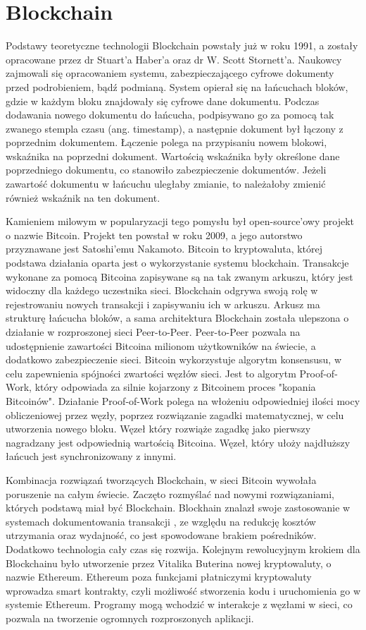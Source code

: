 \documentclass[a4paper,12pt]{book}
\begin{document}
\chapter{Blockchain}
Podstawy teoretyczne technologii Blockchain powstały już w roku 1991, a zostały opracowane przez dr Stuart'a Haber'a oraz dr W. Scott Stornett'a. Naukowcy zajmowali się opracowaniem systemu, zabezpieczającego cyfrowe dokumenty przed podrobieniem, bądź podmianą. System opierał się na łańcuchach bloków, gdzie w każdym bloku znajdowały się cyfrowe dane dokumentu. Podczas dodawania nowego dokumentu do łańcucha, podpisywano go za pomocą tak zwanego stempla czasu (ang. timestamp), a następnie dokument był łączony z poprzednim dokumentem. Łączenie polega na przypisaniu nowem blokowi, wskaźnika na poprzedni dokument. Wartością wskaźnika były określone dane poprzedniego dokumentu, co stanowiło zabezpieczenie dokumentów. Jeżeli zawartość dokumentu w łańcuchu uległaby zmianie, to należałoby zmienić również wskaźnik na ten dokument\cite{pa}.

Kamieniem milowym w popularyzacji tego pomysłu był open-source'owy projekt o nazwie Bitcoin. Projekt ten powstał w roku 2009, a jego autorstwo przyznawane jest Satoshi'emu Nakamoto. Bitcoin to kryptowaluta, której podstawa działania oparta jest o wykorzystanie systemu blockchain. Transakcje wykonane za pomocą Bitcoina zapisywane są na tak zwanym arkuszu, który jest widoczny dla każdego uczestnika sieci. Blockchain odgrywa swoją rolę w rejestrowaniu nowych transakcji i zapisywaniu ich w arkuszu. Arkusz ma strukturę łańcucha bloków, a sama architektura Blockchain została ulepszona o działanie w rozproszonej sieci Peer-to-Peer. Peer-to-Peer pozwala na udostępnienie zawartości Bitcoina milionom użytkowników na świecie, a dodatkowo zabezpieczenie sieci. Bitcoin wykorzystuje algorytm konsensusu, w celu zapewnienia spójności zwartości węzłów sieci. Jest to algorytm Proof-of-Work, który odpowiada za silnie kojarzony z Bitcoinem proces "kopania Bitcoinów".
Działanie Proof-of-Work polega na włożeniu odpowiedniej ilości mocy obliczeniowej przez węzły, poprzez rozwiązanie zagadki matematycznej, w celu utworzenia nowego bloku. Węzeł który rozwiąże zagadkę jako pierwszy nagradzany jest odpowiednią wartością Bitcoina. Węzeł, który ułoży najdłuższy łańcuch jest synchronizowany z innymi\cite{bitcoin}.

Kombinacja rozwiązań tworzących Blockchain, w sieci Bitcoin wywołała poruszenie na całym świecie. Zaczęto rozmyślać nad nowymi rozwiązaniami, których podstawą miał być Blockchain. Blockhain znalazł swoje zastosowanie w systemach dokumentowania transakcji , ze względu na redukcję kosztów utrzymania oraz wydajność, co jest spowodowane\cite{business} brakiem pośredników. Dodatkowo technologia cały czas się rozwija. Kolejnym rewolucyjnym krokiem dla Blockchainu było utworzenie przez Vitalika Buterina nowej kryptowaluty, o nazwie Ethereum. Ethereum poza funkcjami płatniczymi kryptowaluty wprowadza smart kontrakty, czyli możliwość stworzenia kodu i uruchomienia go w systemie Ethereum. Programy mogą wchodzić w interakcje z węzłami w sieci, co pozwala na tworzenie ogromnych rozproszonych aplikacji.
\end{document}
